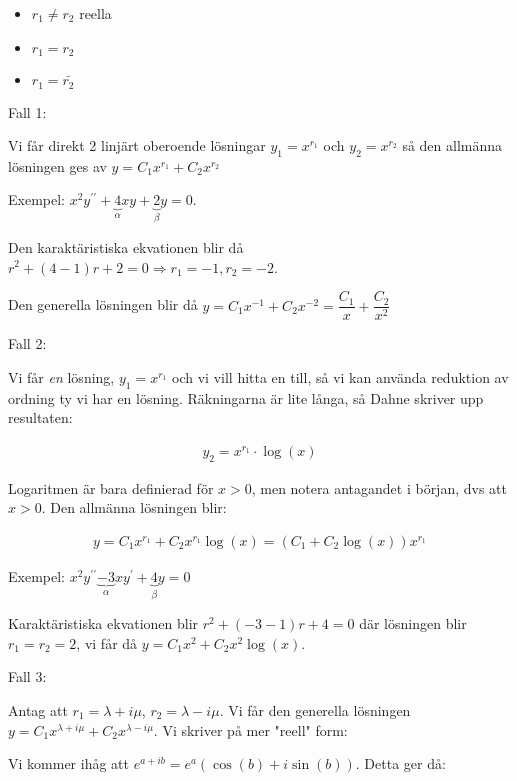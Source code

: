 \begin{itemize}
  \item $r_1\neq r_2$ reella
  \item $r_1 = r_2$
  \item $r_1=\bar{r_2}$ 
\end{itemize}
\par\bigskip
\noindent Fall 1:
\par
\noindent Vi får direkt 2 linjärt oberoende lösningar $y_1 = x^{r_1}$ och $y_2 = x^{r_2}$ så den allmänna lösningen ges av $y=C_1x^{r_1}+C_2x^{r_2}$
\par\bigskip
\noindent Exempel: $x^2y^{\prime\prime}+\underbrace{4}_{\text{$\alpha$}}xy+\underbrace{2}_{\text{$\beta$}}y=0$.\par\noindent Den karaktäristiska ekvationen blir då $r^2+(4-1)r+2 =0 \Rightarrow r_1=-1, r_2 = -2$.\par\noindent Den generella lösningen blir då $y = C_1x^{-1}+C_2x^{-2} = \dfrac{C_1}{x}+\dfrac{C_2}{x^2}$
\par\bigskip
\noindent Fall 2:\par
\noindent Vi får \textit{en} lösning, $y_1 = x^{r_1}$ och vi vill hitta en till, så vi kan använda reduktion av ordning ty vi har en lösning. Räkningarna är lite långa, så Dahne skriver upp resultaten:


\begin{equation*}
  \begin{gathered}
    y_2 = x^{r_1}\cdot\log(x)
  \end{gathered}
\end{equation*}\par
\noindent Logaritmen är bara definierad för $x>0$, men notera antagandet i början, dvs att $x>0$. Den allmänna lösningen blir:


\begin{equation*}
  \begin{gathered}
    y = C_1x^{r_1}+C_2x^{r_1}\log(x) = (C_1+C_2\log(x))x^{r_1}
  \end{gathered}
\end{equation*}\par
\noindent Exempel: $x^2y^{\prime\prime}\underbrace{-3}_{\text{$\alpha$}}xy^{\prime}+\underbrace{4}_{\text{$\beta$}}y = 0$\par
\noindent Karaktäristiska ekvationen blir $r^2+(-3-1)r+4=0$ där lösningen blir $r_1 = r_2 = 2$, vi får då $y=C_1x^2+C_2x^2\log(x)$.
\par\bigskip
\noindent Fall 3:\par
\noindent Antag att  $r_1 = \lambda + i\mu$, $r_2 = \lambda-i\mu$. Vi får den generella lösningen $y = C_1x^{\lambda+i\mu}+C_2x^{\lambda-i\mu}$. Vi skriver på mer "reell" form:\par
\noindent Vi kommer ihåg att $e^{a+ib} = e^a(\cos(b)+i\sin(b))$. Detta ger då:

